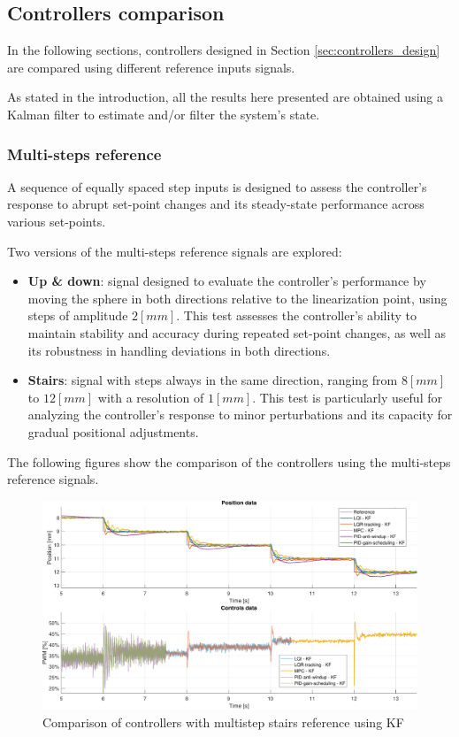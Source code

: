\subsection{Controllers comparison}
\label{subsec:controllers_comparison}

In the following sections, controllers designed in Section \ref{sec:controllers_design} are compared using different reference inputs signals.

As stated in the introduction, all the results here presented are obtained using a Kalman filter to estimate and/or filter the system's state.

\subsubsection{Multi-steps reference}
\label{subsubsec:multisteps_reference}

A sequence of equally spaced step inputs is designed to assess the controller's response to abrupt set-point changes and its steady-state performance across various set-points.

Two versions of the multi-steps reference signals are explored:

\begin{itemize}
    \item \textbf{Up \& down}: signal designed to evaluate the controller's performance by moving the sphere in both directions relative to the linearization point, using steps of amplitude $2 [mm]$.
          This test assesses the controller's ability to maintain stability and accuracy during repeated set-point changes, as well as its robustness in handling deviations in both directions.
    \item \textbf{Stairs}: signal with steps always in the same direction, ranging from $8 [mm]$ to $12 [mm]$ with a resolution of $1 [mm]$.
          This test is particularly useful for analyzing the controller's response to minor perturbations and its capacity for gradual positional adjustments.
\end{itemize}

The following figures show the comparison of the controllers using the multi-steps reference signals.

\begin{figure}[H]
    \centering
    \includegraphics[width=1\linewidth]{./img/MATLAB/results/multisteps_stairs_star_KF.pdf}
    \caption{Comparison of controllers with multistep stairs reference using KF}
\end{figure}

